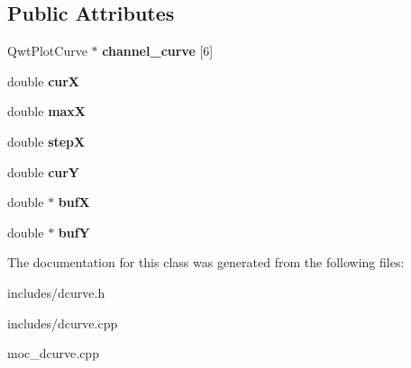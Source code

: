 \subsection*{Public Attributes}
\begin{DoxyCompactItemize}
\item 
\hypertarget{class_d_curve_acc2db7ca766b9b5c2d9c6f7032397a03}{
QwtPlotCurve $\ast$ {\bfseries channel\_\-curve} \mbox{[}6\mbox{]}}
\label{class_d_curve_acc2db7ca766b9b5c2d9c6f7032397a03}

\item 
\hypertarget{class_d_curve_a5baf43c56f376816134a6142b507ec73}{
double {\bfseries curX}}
\label{class_d_curve_a5baf43c56f376816134a6142b507ec73}

\item 
\hypertarget{class_d_curve_a4f81003bc16287be2e4e66a3044a76d2}{
double {\bfseries maxX}}
\label{class_d_curve_a4f81003bc16287be2e4e66a3044a76d2}

\item 
\hypertarget{class_d_curve_a9bd8ccefa03ddc68cbfc03b1c3bb3a6e}{
double {\bfseries stepX}}
\label{class_d_curve_a9bd8ccefa03ddc68cbfc03b1c3bb3a6e}

\item 
\hypertarget{class_d_curve_a7b38ab86178c06b8196a296080238004}{
double {\bfseries curY}}
\label{class_d_curve_a7b38ab86178c06b8196a296080238004}

\item 
\hypertarget{class_d_curve_abb5763bcf75f0e9a7acff6f5034053ef}{
double $\ast$ {\bfseries bufX}}
\label{class_d_curve_abb5763bcf75f0e9a7acff6f5034053ef}

\item 
\hypertarget{class_d_curve_ab2bd801046ff512f1ee5b09ae1e90a04}{
double $\ast$ {\bfseries bufY}}
\label{class_d_curve_ab2bd801046ff512f1ee5b09ae1e90a04}

\end{DoxyCompactItemize}


The documentation for this class was generated from the following files:\begin{DoxyCompactItemize}
\item 
includes/dcurve.h\item 
includes/dcurve.cpp\item 
moc\_\-dcurve.cpp\end{DoxyCompactItemize}
